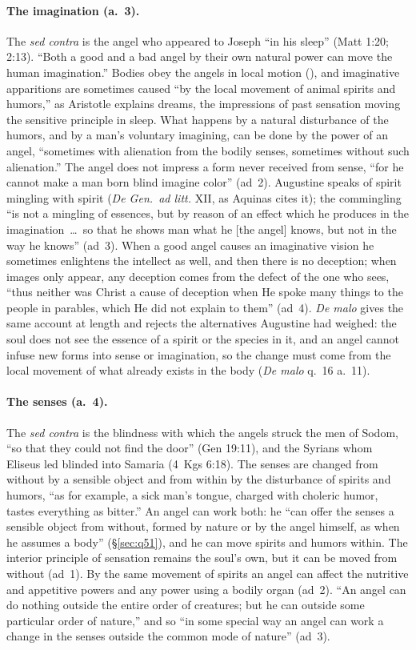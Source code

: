\paragraph{The imagination (a.~3).} The \emph{sed contra} is the angel who
appeared to Joseph ``in his sleep'' (Matt 1:20; 2:13). ``Both a good and a
bad angel by their own natural power can move the human imagination.''
Bodies obey the angels in local motion (), and
imaginative apparitions are sometimes caused ``by the local movement of
animal spirits and humors,'' as Aristotle explains dreams, the impressions
of past sensation moving the sensitive principle in sleep. What happens by
a natural disturbance of the humors, and by a man's voluntary imagining,
can be done by the power of an angel, ``sometimes with alienation from the
bodily senses, sometimes without such alienation.'' The angel does not
impress a form never received from sense, ``for he cannot make a man born
blind imagine color'' (ad~2). Augustine speaks of spirit mingling with
spirit (\emph{De Gen.\ ad litt.} XII, as Aquinas cites it); the
commingling ``is not a mingling of essences, but by reason of an effect
which he produces in the imagination~\dots\ so that he shows man what he
[the angel] knows, but not in the way he knows'' (ad~3). When a good angel
causes an imaginative vision he sometimes enlightens the intellect as
well, and then there is no deception; when images only appear, any
deception comes from the defect of the one who sees, ``thus neither was
Christ a cause of deception when He spoke many things to the people in
parables, which He did not explain to them'' (ad~4). \emph{De malo} gives
the same account at length and rejects the alternatives Augustine had
weighed: the soul does not see the essence of a spirit or the species in
it, and an angel cannot infuse new forms into sense or imagination, so the
change must come from the local movement of what already exists in the
body (\emph{De malo} q.~16 a.~11).

\paragraph{The senses (a.~4).} The \emph{sed contra} is the blindness with
which the angels struck the men of Sodom, ``so that they could not find the
door'' (Gen 19:11), and the Syrians whom Eliseus led blinded into Samaria
(4~Kgs 6:18). The senses are changed from without by a sensible object and
from within by the disturbance of spirits and humors, ``as for example, a
sick man's tongue, charged with choleric humor, tastes everything as
bitter.'' An angel can work both: he ``can offer the senses a sensible
object from without, formed by nature or by the angel himself, as when he
assumes a body'' (\S\ref{sec:q51}), and he can move spirits and humors
within. The interior principle of sensation remains the soul's own, but it
can be moved from without (ad~1). By the same movement of spirits an angel
can affect the nutritive and appetitive powers and any power using a bodily
organ (ad~2). ``An angel can do nothing outside the entire order of
creatures; but he can outside some particular order of nature,'' and so
``in some special way an angel can work a change in the senses outside the
common mode of nature'' (ad~3).

